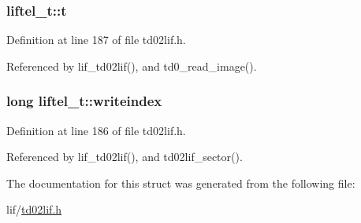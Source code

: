 \subsubsection[{\texorpdfstring{t}{t}}]{ liftel\+\_\+t\+::t}\hypertarget{structliftel__t_a19ad0aafb060bc0262c7946220f0c407}{}\label{structliftel__t_a19ad0aafb060bc0262c7946220f0c407}


Definition at line 187 of file td02lif.\+h.



Referenced by lif\+\_\+td02lif(), and td0\+\_\+read\+\_\+image().

\subsubsection[{\texorpdfstring{writeindex}{writeindex}}]{\setlength{\rightskip}{0pt plus 5cm}long liftel\+\_\+t\+::writeindex}\hypertarget{structliftel__t_a3c5f11408ea86ded8a0bc0d20a0ea689}{}\label{structliftel__t_a3c5f11408ea86ded8a0bc0d20a0ea689}


Definition at line 186 of file td02lif.\+h.



Referenced by lif\+\_\+td02lif(), and td02lif\+\_\+sector().



The documentation for this struct was generated from the following file\+:\begin{DoxyCompactItemize}
\item 
lif/\hyperlink{td02lif_8h}{td02lif.\+h}\end{DoxyCompactItemize}
